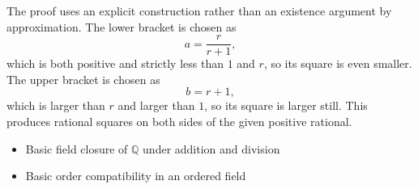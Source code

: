 \begin{remark*}
The proof uses an explicit construction rather than an existence argument by
approximation. The lower bracket is chosen as
\[
a=\frac{r}{r+1},
\]
which is both positive and strictly less than $1$ and $r$, so its square is
even smaller. The upper bracket is chosen as
\[
b=r+1,
\]
which is larger than $r$ and larger than $1$, so its square is larger still.
This produces rational squares on both sides of the given positive rational.
\end{remark*}

\begin{dependencies}
\begin{itemize}
  \item Basic field closure of $\mathbb{Q}$ under addition and division
  \item Basic order compatibility in an ordered field
\end{itemize}
\end{dependencies}

\clearpage
